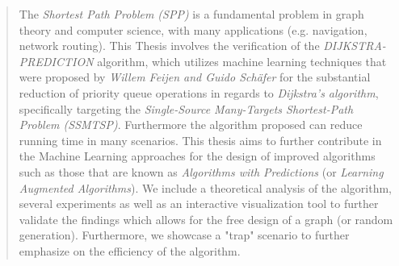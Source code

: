 \begin{abstract}
The \textit{Shortest Path Problem (SPP)} is a fundamental problem in graph theory and computer science, with many applications (e.g. navigation, network routing).
This Thesis involves the verification of the \textit{DIJKSTRA-PREDICTION} algorithm, 
which utilizes machine learning techniques that were proposed by \textit{Willem Feijen and Guido Schäfer} for the substantial reduction of priority queue operations in regards to \textit{Dijkstra's algorithm}, 
specifically targeting the \textit{Single-Source Many-Targets Shortest-Path Problem (SSMTSP)}. Furthermore the algorithm proposed can reduce running time in many scenarios. 
This thesis aims to further contribute in the Machine Learning approaches for the design of improved algorithms such as those that are known as \textit{Algorithms with Predictions} (or \textit{Learning Augmented Algorithms}). 
We include a theoretical analysis of the algorithm, several experiments as well as an interactive visualization tool to further validate the findings which allows for the free design of a graph (or random generation). Furthermore, we showcase a "trap" scenario to further emphasize on the efficiency of the algorithm.
\end{abstract}